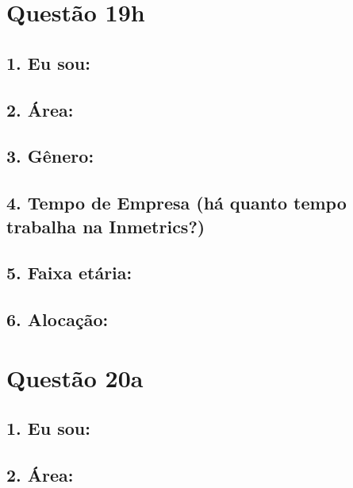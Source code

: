 \documentclass[]{book}
\begin{document}
\hypertarget{questao-19h}{%
\section{Questão 19h}\label{questao-19h}}

\hypertarget{eu-sou-52}{%
\subsection{1. Eu sou:}\label{eu-sou-52}}

\hypertarget{area-52}{%
\subsection{2. Área:}\label{area-52}}

\hypertarget{genero-52}{%
\subsection{3. Gênero:}\label{genero-52}}

\hypertarget{tempo-de-empresa-ha-quanto-tempo-trabalha-na-inmetrics-52}{%
\subsection{4. Tempo de Empresa (há quanto tempo trabalha na Inmetrics?)}\label{tempo-de-empresa-ha-quanto-tempo-trabalha-na-inmetrics-52}}

\hypertarget{faixa-etaria-52}{%
\subsection{5. Faixa etária:}\label{faixa-etaria-52}}

\hypertarget{alocacao-52}{%
\subsection{6. Alocação:}\label{alocacao-52}}

\hypertarget{questao-20a}{%
\section{Questão 20a}\label{questao-20a}}

\hypertarget{eu-sou-53}{%
\subsection{1. Eu sou:}\label{eu-sou-53}}

\hypertarget{area-53}{%
\subsection{2. Área:}\label{area-53}}
\end{document}
